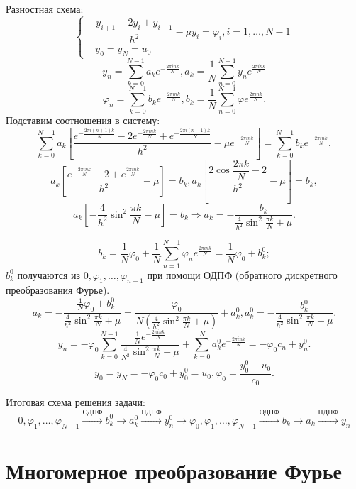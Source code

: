 Разностная схема:
\[ \left\lbrace \begin{aligned}
    & \dfrac{y_{i + 1} - 2 y_i + y_{i - 1}}{h^2} - \mu y_i = \varphi_i, i = 1, \ldots, N - 1 \\
    & y_0 = y_N = u_0
\end{aligned} \right. \]
\[ y_n = \sum \limits_{k = 0}^{N - 1} a_k e^{-\frac{2\pi i n k}{N}}, a_k = \dfrac{1}{N} \sum \limits_{n = 0}^{N - 1} y_n e^{\frac{2\pi i n k}{N}} \]
\[ \varphi_n = \sum \limits_{k = 0}^{N - 1} b_k e^{-\frac{2 \pi i n k}{N}}, b_k = \dfrac{1}{N} \sum \limits_{n = 0}^{N - 1} \varphi e^{\frac{2 \pi i n k}{N}}. \]
Подставим соотношения в систему:
\[ \sum \limits_{k = 0}^{N - 1} a_k \left[ \dfrac{e^{-\frac{2\pi i (n + 1) k}{N}} - 2 e^{-\frac{2\pi i n k}{N}} + e^{-\frac{2\pi i (n - 1) k}{N}}}{h^2} - \mu e^{-\frac{2\pi i n k}{N}} \right] = \sum \limits_{k = 0}^{N - 1} b_k e^{-\frac{2\pi i n k}{N}}, \]
\[ a_k \left[ \dfrac{e^{-\frac{2 \pi i n k}{N}} - 2 + e^{\frac{2\pi i n k}{N}}}{h^2} - \mu \right] = b_k, a_k \left[ \dfrac{2 \cos{\dfrac{2 \pi k}{N}} - 2}{h^2} - \mu \right] = b_k, \]
\[ a_k \left[ -\dfrac{4}{h^2} \sin^2 \dfrac{\pi k}{N} - \mu \right] = b_k \Rightarrow a_k = -\dfrac{b_k}{\frac{4}{h^2} \sin^2 \frac{\pi k}{N} + \mu}. \]

\[ b_k = \dfrac{1}{N} \varphi_0 + \dfrac{1}{N} \sum \limits_{n = 1}^{N - 1} \varphi_n e^{\frac{2 \pi i n k}{N}} = \dfrac{1}{N} \varphi_0 + b_k^0; \]
\( b_k^0 \) получаются из \( 0, \varphi_1, \ldots, \varphi_{n-1} \) при помощи ОДПФ (обратного дискретного преобразования Фурье).
\[ a_k = -\dfrac{-\frac{1}{N} \varphi_0 + b_k^0}{\frac{4}{h^2} \sin^2 \frac{\pi k}{N} + \mu} = \dfrac{\varphi_0}{N \left( \frac{4}{h^2} \sin^2 \frac{\pi k}{N} + \mu \right)} + a_k^0, a_k^0 = -\dfrac{b_k^0}{\frac{4}{h^2} \sin^2 \frac{\pi k}{N} + \mu}. \]
\[ y_n = -\varphi_0 \sum \limits_{k = 0}^{N - 1} \dfrac{\frac{1}{N} e^{-\frac{2\pi i n k}{N}}}{\frac{4}{N^2} \sin^2 \frac{\pi k}{N} + \mu} + \sum \limits_{k = 0}^N a_k^0  e^{-\frac{2 \pi i n k}{N}} = -\varphi_0 c_n + y_n^0. \]
\[ y_0 = y_N = -\varphi_0 c_0 + y_0^0 = u_0, \varphi_0 = \dfrac{y_0^0 - u_0}{c_0}. \]

Итоговая схема решения задачи:
\[ 0, \varphi_1, \ldots, \varphi_{N-1} \xrightarrow[]{\text{ОДПФ}} b_k^0 \rightarrow a_k^0 \xrightarrow[]{\text{ПДПФ}} y_n^0 \rightarrow \varphi_0, \varphi_1, \ldots, \varphi_{N-1} \xrightarrow[]{\text{ОДПФ}} b_k \rightarrow a_k \xrightarrow[]{\text{ПДПФ}} y_n \]

\section{Многомерное преобразование Фурье}

